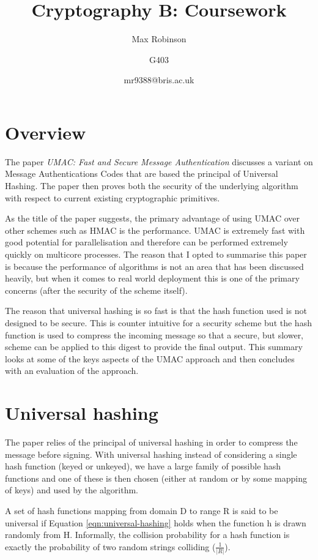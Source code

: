 \documentclass[10pt]{article} %
\title{Cryptography B: Coursework}
\author{Max Robinson \and G403 \and mr9388@bris.ac.uk}
\begin{document}
\maketitle 
\section{Overview}

The paper \emph{UMAC: Fast and Secure Message Authentication}\cite{umac} discusses a
variant on Message Authentications Codes that are based the
principal of Universal Hashing. The paper then proves both the security of the
underlying algorithm with respect to current existing cryptographic
primitives.

As the title of the paper suggests, the primary advantage of using UMAC over
other schemes such as HMAC is the performance. UMAC is extremely fast with good
potential for parallelisation and therefore can be performed extremely quickly on
 multicore processes. The reason that I opted to summarise this paper is
because the performance of algorithms is not an area that has been discussed
heavily, but when it comes to real world deployment this is one of the primary
concerns (after the security of the scheme itself).

The reason that universal hashing is so fast is that the hash function used is
not designed to be secure. This is counter intuitive for a security scheme but
the hash function is used to compress the incoming message so that a secure,
but slower, scheme can be applied to this digest to provide the final output.
This summary looks at some of the keys aspects of the UMAC approach and then
concludes with an evaluation of the approach.

\section{Universal hashing}

The paper relies of the principal of universal hashing in order to compress the
message before signing. With universal hashing instead of considering a single
hash function (keyed or unkeyed), we have a large family of possible hash
functions and one of these is then chosen (either at random or by some mapping
of keys) and used by the algorithm.

A set of hash functions mapping from domain D to range R is said to be
universal if Equation \ref{eqn:universal-hashing} holds when the function h is drawn
randomly from H. Informally, the collision probability for a hash function is
exactly the probability of two random strings colliding ($\frac{1}{|R|}$).
\end{document}
